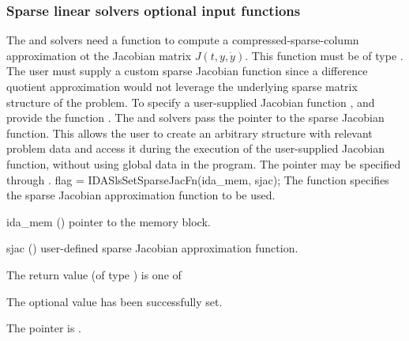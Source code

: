 {%
\subsubsection{Sparse linear solvers optional input functions}\label{sss:optin_sls}
The 
{\idaklu} and {\idasuperlumt} solvers need a function to compute a
compressed-sparse-column approximation ot the Jacobian matrix $J(t,y,\dot{y})$.  
This function must be of type . 
The user must supply a custom sparse Jacobian function since a
difference quotient approximation would not leverage the underlying
sparse matrix structure of the problem.  To specify a user-supplied
Jacobian function , {\idaklu} and {\idasuperlumt} provide
the function .  The {\idaklu} and
{\idasuperlumt} solvers pass the pointer  to the sparse
Jacobian function. This allows the user to create an arbitrary
structure with relevant problem data and access it during the
execution of the user-supplied Jacobian function, without using global
data in the program.  The pointer  may be specified
through .
{
  flag = IDASlsSetSparseJacFn(ida\_mem, sjac);
}
{
  The function  specifies the sparse Jacobian
  approximation function to be used.
}
{
  \begin{args}
  \item[ida\_mem] ()
    pointer to the {\ida} memory block.
  \item[sjac] ()
    user-defined sparse Jacobian approximation function.
  \end{args}
}
{
  The return value  (of type ) is one of
  \begin{args}
  \item[\Id{IDASLS\_SUCCESS}] 
    The optional value has been successfully set.
  \item[\Id{IDASLS\_MEM\_NULL}]
    The  pointer is .
  \item[\Id{IDASLS\_LMEM\_NULL}]

\end{args}}}
